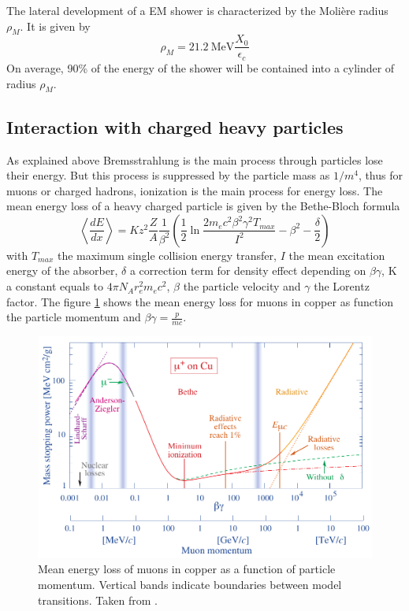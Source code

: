 The lateral development of a EM shower is characterized by the Moli\`ere radius $\rho_{M}$. It is given by \cite{Wigmans:392793}
\begin{equation}
  \rho_{M} = \SI{21.2}{\mega\eV} \frac{X_0}{\epsilon_c}
\end{equation}
On average, 90\% of the energy of the shower will be contained into a cylinder of radius $\rho_{M}$.

\subsection{Interaction with charged heavy particles}

As explained above Bremsstrahlung is the main process through particles lose their energy. But this process is suppressed by the particle mass as $1/m^4$, thus for muons or charged hadrons, ionization is the main process for energy loss. The mean energy loss of a heavy charged particle is given by the Bethe-Bloch formula \cite{Wigmans:392793}
\begin{equation}
  \left<\frac{dE}{dx}\right> = Kz^2\frac{Z}{A}\frac{1}{\beta^2}\left(\frac{1}{2}\ln\frac{2m_ec^2\beta^2\gamma^2T_{max}}{I^2} - \beta^2 - \frac{\delta}{2}\right)
\end{equation}
with $T_{max}$ the maximum single collision energy transfer, $I$ the mean excitation energy of the absorber, $\delta$ a correction term for density effect depending on $\beta\gamma$, K a constant equals to $4\pi{}N_Ar_e^2m_ec^2$, $\beta$ the particle velocity and $\gamma$ the Lorentz factor. The figure \ref{fig:BetheBloch} shows the mean energy loss for muons in copper as function the particle momentum and $\beta\gamma = \frac{p}{mc}$.

\begin{figure}[htbp!]
  \centering
  \includegraphics[width=0.7\linewidth]{chap2/fig/rpp_icru49_cu_col.pdf}
  \caption{Mean energy loss of muons in copper as a function of particle momentum. Vertical bands indicate boundaries between model transitions. Taken from \cite{Patrignani:2016xqp}.} \label{fig:BetheBloch}
\end{figure}

